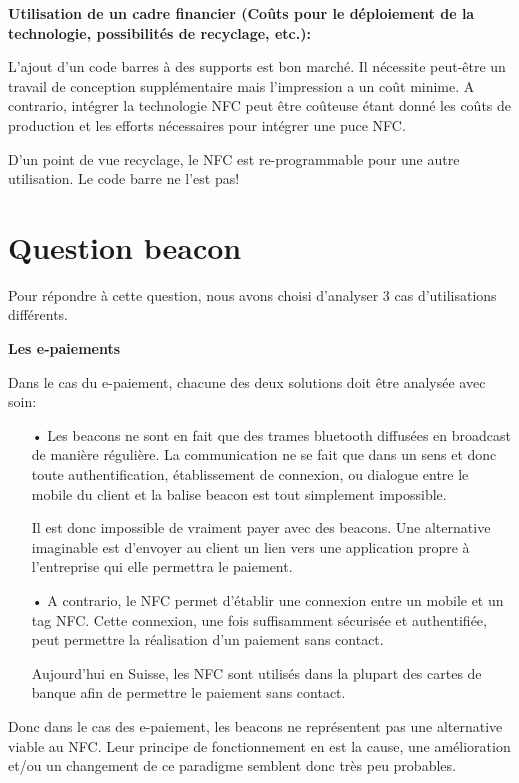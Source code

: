 \documentclass[12pt]{article}
\begin{document}
\textbf{Utilisation de un cadre financier (Coûts pour le déploiement de la technologie, possibilités de recyclage, etc.):}
\medskip

L'ajout d'un code barres à des supports est bon marché. Il nécessite peut-être un travail de conception supplémentaire mais l'impression a un coût minime.
A contrario, intégrer la technologie NFC peut être coûteuse étant donné les coûts de production et les efforts nécessaires pour intégrer une puce NFC.

D'un point de vue recyclage, le NFC est re-programmable pour une autre utilisation. Le code barre ne l'est pas!

\section*{Question beacon}

Pour répondre à cette question, nous avons choisi d'analyser 3 cas d'utilisations différents.

\textbf{Les e-paiements}\label{epaiement}
\medskip

Dans le cas du e-paiement, chacune des deux solutions doit être analysée avec soin:

\begin{enumerate}
\item[•] Les beacons ne sont en fait que des trames bluetooth diffusées en broadcast de manière régulière. La communication ne se fait que dans un sens et donc toute authentification, établissement de connexion, ou dialogue entre le mobile du client et la balise beacon est tout simplement impossible.

Il est donc impossible de vraiment payer avec des beacons. Une alternative imaginable est d'envoyer au client un lien vers une application propre à l'entreprise qui elle permettra le paiement. 

\item[•] A contrario, le NFC permet d'établir une connexion entre un mobile et un tag NFC. Cette connexion, une fois suffisamment sécurisée et authentifiée, peut permettre la réalisation d'un paiement sans contact. 

Aujourd'hui en Suisse, les NFC sont utilisés dans la plupart des cartes de banque afin de permettre le paiement sans contact.
\end{enumerate}

Donc dans le cas des e-paiement, les beacons ne représentent pas une alternative viable au NFC. Leur principe de fonctionnement en est la cause, une amélioration et/ou un changement de ce paradigme semblent donc très peu probables. \\
\end{document}
